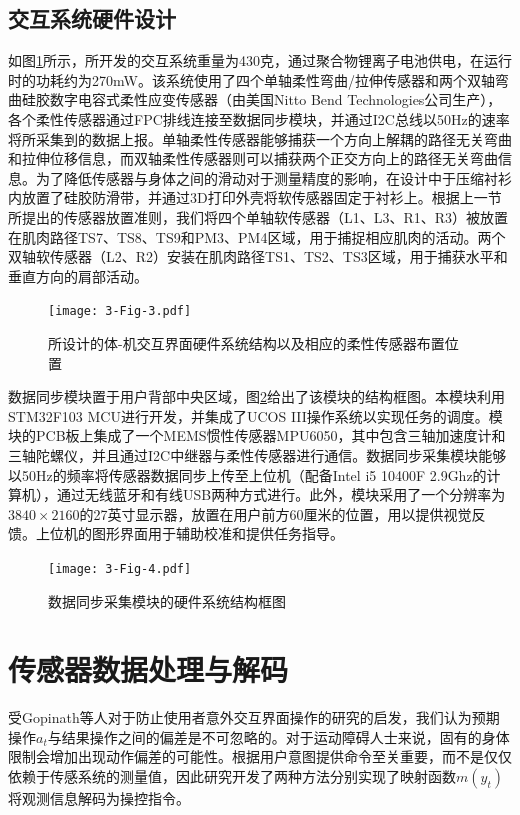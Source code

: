 \subsection{交互系统硬件设计}如图\ref{fig:3-3}所示，所开发的交互系统重量为430克，通过聚合物锂离子电池供电，在运行时的功耗约为270mW。该系统使用了四个单轴柔性弯曲/拉伸传感器和两个双轴弯曲硅胶数字电容式柔性应变传感器（由美国Nitto Bend Technologies公司生产），各个柔性传感器通过FPC排线连接至数据同步模块，并通过I2C总线以50Hz的速率将所采集到的数据上报。单轴柔性传感器能够捕获一个方向上解耦的路径无关弯曲和拉伸位移信息，而双轴柔性传感器则可以捕获两个正交方向上的路径无关弯曲信息。为了降低传感器与身体之间的滑动对于测量精度的影响，在设计中于压缩衬衫内放置了硅胶防滑带，并通过3D打印外壳将软传感器固定于衬衫上。根据上一节所提出的传感器放置准则，我们将四个单轴软传感器（L1、L3、R1、R3）被放置在肌肉路径TS7、TS8、TS9和PM3、PM4区域，用于捕捉相应肌肉的活动。两个双轴软传感器（L2、R2）安装在肌肉路径TS1、TS2、TS3区域，用于捕获水平和垂直方向的肩部活动。

\begin{figure}[htb]
    \centering
    \texttt{[image: 3-Fig-3.pdf]}
    \caption{所设计的体-机交互界面硬件系统结构以及相应的柔性传感器布置位置}
    \label{fig:3-3}
\end{figure}     

数据同步模块置于用户背部中央区域，图\ref{fig:3-4}给出了该模块的结构框图。本模块利用STM32F103 MCU进行开发，并集成了UCOS III操作系统以实现任务的调度。模块的PCB板上集成了一个MEMS惯性传感器MPU6050，其中包含三轴加速度计和三轴陀螺仪，并且通过I2C中继器与柔性传感器进行通信。数据同步采集模块能够以50Hz的频率将传感器数据同步上传至上位机（配备Intel i5 10400F 2.9Ghz的计算机），通过无线蓝牙和有线USB两种方式进行。此外，模块采用了一个分辨率为$3840\times2160$的27英寸显示器，放置在用户前方60厘米的位置，用以提供视觉反馈。上位机的图形界面用于辅助校准和提供任务指导。

\begin{figure}[htb]
    \centering
    \texttt{[image: 3-Fig-4.pdf]}
    \caption{数据同步采集模块的硬件系统结构框图}
    \label{fig:3-4}
\end{figure} 
\section{传感器数据处理与解码} 
受Gopinath等人对于防止使用者意外交互界面操作的研究\cite{gopinathCustomizedHandlingUnintended2021}的启发，我们认为预期操作$a_t$与结果操作之间的偏差是不可忽略的。对于运动障碍人士来说，固有的身体限制会增加出现动作偏差的可能性。根据用户意图提供命令至关重要，而不是仅仅依赖于传感系统的测量值，因此研究开发了两种方法分别实现了映射函数$m(y_t)$将观测信息解码为操控指令。  

